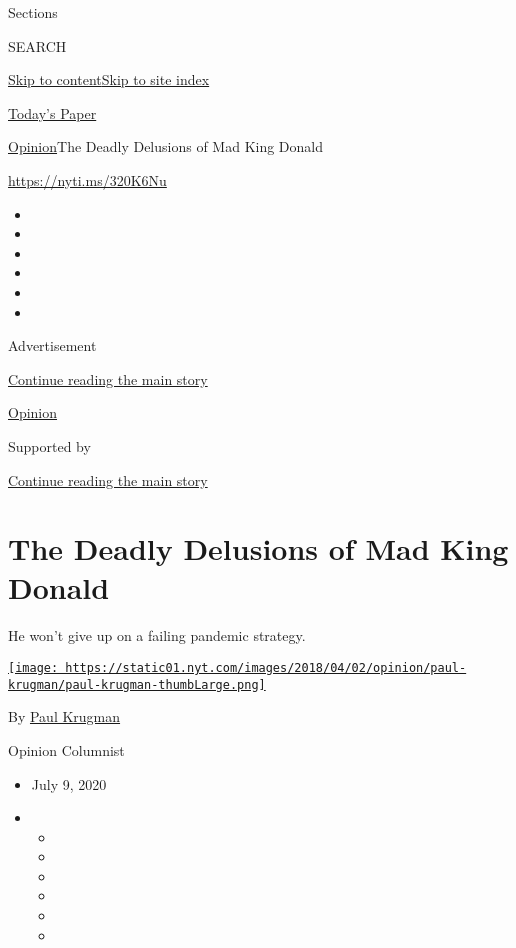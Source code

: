 Sections

SEARCH

\protect\hyperlink{site-content}{Skip to
content}\protect\hyperlink{site-index}{Skip to site index}

\href{https://myaccount.nytimes.com/auth/login?response_type=cookie\&client_id=vi}{}

\href{https://www.nytimes.com/section/todayspaper}{Today's Paper}

\href{/section/opinion}{Opinion}\textbar{}The Deadly Delusions of Mad
King Donald

\href{https://nyti.ms/320K6Nu}{https://nyti.ms/320K6Nu}

\begin{itemize}
\item
\item
\item
\item
\item
\item
\end{itemize}

Advertisement

\protect\hyperlink{after-top}{Continue reading the main story}

\href{/section/opinion}{Opinion}

Supported by

\protect\hyperlink{after-sponsor}{Continue reading the main story}

\hypertarget{the-deadly-delusions-of-mad-king-donald}{%
\section{The Deadly Delusions of Mad King
Donald}\label{the-deadly-delusions-of-mad-king-donald}}

He won't give up on a failing pandemic strategy.

\href{https://www.nytimes.com/by/paul-krugman}{\texttt{[image: https://static01.nyt.com/images/2018/04/02/opinion/paul-krugman/paul-krugman-thumbLarge.png]}}

By \href{https://www.nytimes.com/by/paul-krugman}{Paul Krugman}

Opinion Columnist

\begin{itemize}
\item
  July 9, 2020
\item
  \begin{itemize}
  \item
  \item
  \item
  \item
  \item
  \item
  \end{itemize}
\end{itemize}

